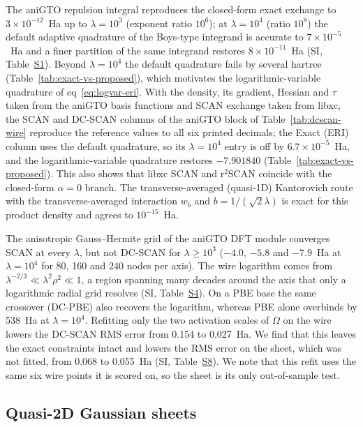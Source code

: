 \documentclass[journal=jctcce,manuscript=article]{achemso}
\begin{document}
The aniGTO repulsion integral reproduces the closed-form exact exchange to
$3\times10^{-12}$~Ha up to $\lambda=10^3$ (exponent ratio $10^6$); at
$\lambda=10^4$ (ratio $10^8$) the default adaptive quadrature of the Boys-type
integrand is accurate to $7\times10^{-5}$~Ha and a finer partition of the same
integrand restores $8\times10^{-11}$~Ha (SI, Table~\href{si.pdf\#table.1}{S1}).
Beyond $\lambda=10^4$ the default quadrature fails by several hartree
(Table~\ref{tab:exact-vs-proposed}), which motivates the logarithmic-variable
quadrature of eq~\ref{eq:logvar-eri}.  With the density, its gradient,
Hessian and $\tau$ taken from the aniGTO basis functions and SCAN exchange
taken from libxc, the SCAN and DC-SCAN columns of the aniGTO block of
Table~\ref{tab:dcscan-wire} reproduce the reference values to all six printed
decimals; the Exact (ERI) column uses the default quadrature, so its
$\lambda=10^4$ entry is off by $6.7\times10^{-5}$~Ha, and the
logarithmic-variable quadrature restores $-7.901840$
(Table~\ref{tab:exact-vs-proposed}).  This also shows that libxc SCAN and
r$^2$SCAN coincide with the closed-form $\alpha=0$ branch.  The
transverse-averaged (quasi-1D) Kantorovich route with the transverse-averaged
interaction $w_b$ and $b=1/(\sqrt2\lambda)$ is exact for this product density
and agrees to $10^{-15}$~Ha.

The anisotropic Gauss--Hermite grid of the aniGTO DFT module converges SCAN
at every $\lambda$, but not DC-SCAN for $\lambda\ge10^3$ ($-4.0$, $-5.8$ and
$-7.9$~Ha at $\lambda=10^4$ for 80, 160 and 240 nodes per axis).  The wire
logarithm comes from $\lambda^{-2/3}\ll\lambda^2\rho^2\ll1$, a region spanning
many decades around the axis that only a logarithmic radial grid resolves
(SI, Table~\href{si.pdf\#table.4}{S4}).  On a PBE base the same crossover
(DC-PBE) also recovers the logarithm, whereas PBE alone overbinds by 538~Ha at
$\lambda=10^4$.  Refitting only the two activation scales of $\Omega$ on the
wire lowers the DC-SCAN RMS error from 0.154 to 0.027~Ha.  We find that this leaves the
exact constraints intact and lowers the RMS error on the sheet, which was not
fitted, from 0.068 to 0.055~Ha (SI, Table~\href{si.pdf\#table.8}{S8}).  We note
that this refit uses the same six wire points it is scored on, so the sheet is
its only out-of-sample test.

\subsection{Quasi-2D Gaussian sheets}
\label{sec:sheet}
\end{document}
